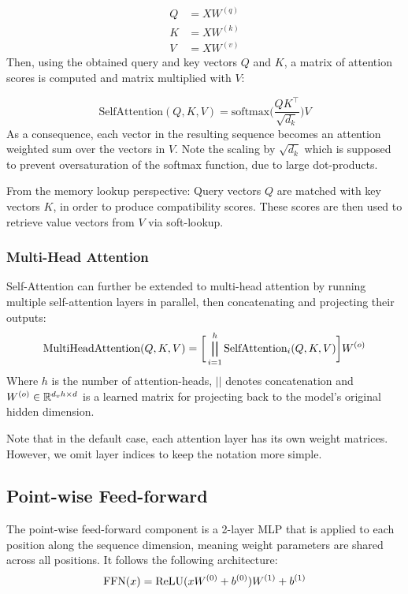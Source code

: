 \begin{align}
    Q & = X W^{(q)} \\
    K & = X W^{(k)} \\
    V & = X W^{(v)}
\end{align}
Then, using the obtained query and key vectors $Q$ and $K$, a matrix of attention scores is computed and matrix multiplied with $V$:

\begin{equation}
    \text{SelfAttention}(Q, K, V) = \text{softmax}\bigg(\frac{Q K^\top}{\sqrt{d_k}}\bigg) V
\end{equation}
As a consequence, each vector in the resulting sequence becomes an attention weighted sum over the vectors in $V$. Note the scaling by $\sqrt{d_k}$ which is supposed to prevent oversaturation of the softmax function, due to large dot-products.

From the memory lookup perspective: Query vectors $Q$ are matched with key vectors $K$, in order to produce compatibility scores. These scores are then used to retrieve value vectors from $V$ via soft-lookup.

\subsubsection{Multi-Head Attention}
Self-Attention can further be extended to multi-head attention by running multiple self-attention layers in parallel, then concatenating and projecting their outputs:
\begin{equation}
    \text{MultiHeadAttention}(Q, K, V) = \bigg[ \bigparallel_{i=1}^h \text{SelfAttention}_i(Q,K,V) \bigg] W^{(o)}
\end{equation}
Where $h$ is the number of attention-heads, $||$ denotes concatenation and $W^{(o)} \in \mathbb{R}^{d_v h \times d}$ is a learned matrix for projecting back to the model's original hidden dimension.

Note that in the default case, each attention layer has its own weight matrices. However,  we omit layer indices to keep the notation more simple.

\subsection{Point-wise Feed-forward}
The point-wise feed-forward component is a 2-layer MLP that is applied to each position along the sequence dimension, meaning weight parameters are shared across all positions. It follows the following architecture:
\begin{equation}
    \text{FFN}(x) = \text{ReLU}(x W^{(0)} + b^{(0)}) W^{(1)} + b^{(1)}
\end{equation}

